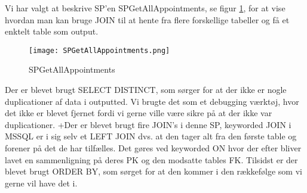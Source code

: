 Vi har valgt at beskrive SP'en SPGetAllAppointments, se figur \ref{SPGetAllAppointments}, for at vise hvordan man kan bruge JOIN til at hente fra flere forskellige tabeller og få et enktelt table som output.

\begin{figure}[h]
    \caption{SPGetAllAppointments}
    \centering
        \texttt{[image: SPGetAllAppointments.png]}
    \label{SPGetAllAppointments}
\end{figure}

Der er blevet brugt SELECT DISTINCT, som sørger for at der ikke er nogle duplicationer af data i outputted. Vi brugte det som et debugging værktøj, hvor det ikke er blevet fjernet fordi vi gerne ville være sikre på at der ikke var duplicationer.
+Der er blevet brugt fire JOIN's i denne SP, keyworded JOIN i MSSQL er i sig selv et LEFT JOIN dvs. at den tager alt fra den første table og forener på det de har tilfælles. Det gøres ved keyworded ON hvor der efter bliver lavet en sammenligning på deres PK og den modsatte tables FK.
Tilsidst er der blevet brugt ORDER BY, som sørget for at den kommer i den rækkefølge som vi gerne vil have det i.
